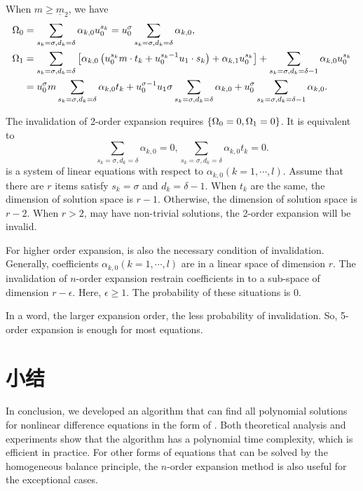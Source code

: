 When $m\ge\underline{m}_2$, we have
\begin{equation}
\begin{split}
\Omega_0&=\sum_{s_k=\sigma,d_k=\delta}{\alpha_{k,0}u_0^{s_k}}=u_0^\sigma\sum_{s_k=\sigma,d_k=\delta}{\alpha_{k,0}} , \\
\Omega_1&=\sum_{s_k=\sigma,d_k=\delta}\left[\alpha_{k,0}\left(u_0^{s_k}m\cdot {t_k}+u_0^{{s_k}-1}u_1\cdot {s_k}\right)+\alpha_{k,1}u_0^{s_k}\right]+\sum_{s_k=\sigma,d_k=\delta-1}{\alpha_{k,0}u_0^{s_k}} \\
&=u_0^\sigma m \sum_{s_k=\sigma,d_k=\delta}{\alpha_{k,0}t_k}+u_0^{\sigma-1}u_1\sigma\sum_{s_k=\sigma,d_k=\delta}{\alpha_{k,0}}+u_0^\sigma\sum_{s_k=\sigma,d_k=\delta-1}{\alpha_{k,0}} .
\end{split}
\end{equation}

The invalidation of 2-order expansion requires $\left\{\Omega_0=0,\Omega_1=0\right\}$. It is equivalent to
\begin{equation}
\sum_{s_k=\sigma,d_k=\delta}{\alpha_{k,0}}=0,\sum_{s_k=\sigma,d_k=\delta}{\alpha_{k,0}t_k}=0 .\label{invalid}
\end{equation}
 is a system of linear equations with respect to $\alpha_{k,0} (k=1,\cdots,l)$. Assume that there are $r$ items satisfy $s_k=\sigma$ and $d_k=\delta-1$. When $t_k$ are the same, the dimension of solution space is $r-1$. Otherwise, the dimension of solution space is $r-2$. When $r>2$,  may have non-trivial solutions, the 2-order expansion will be invalid.

For higher order expansion,  is also the necessary condition of invalidation. Generally, coefficients $\alpha_{k,0} (k=1,\cdots,l)$ are in a linear space of dimension $r$. The invalidation of $n$-order expansion restrain coefficients in to a sub-space of dimension $r-\epsilon$. Here, $\epsilon\ge 1$. The probability of these situations is 0.

In a word, the larger expansion order, the less probability of invalidation. So, 5-order expansion is enough for most equations.

\section{小结}

In conclusion, we developed an algorithm that can find all polynomial solutions for nonlinear difference equations in the form of . Both theoretical analysis and experiments show that the algorithm has a polynomial time complexity, which is efficient in practice. For other forms of equations that can be solved by the homogeneous balance principle, the $n$-order expansion method is also useful for the  exceptional cases.
